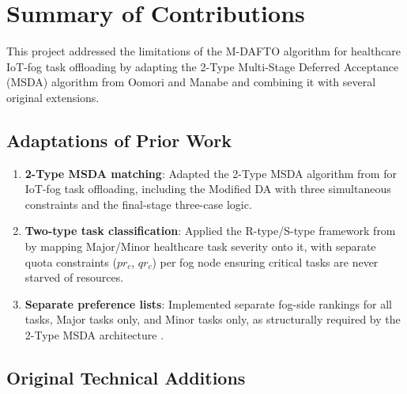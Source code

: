
\section{Summary of Contributions}

This project addressed the limitations of the M-DAFTO algorithm for healthcare IoT-fog task offloading by adapting the 2-Type Multi-Stage Deferred Acceptance (MSDA) algorithm from Oomori and Manabe \cite{oomori2026strategyproof} and combining it with several original extensions.

\subsection*{Adaptations of Prior Work}

\begin{enumerate}
\item \textbf{2-Type MSDA matching}: Adapted the 2-Type MSDA algorithm from \cite{oomori2026strategyproof} for IoT-fog task offloading, including the Modified DA with three simultaneous constraints and the final-stage three-case logic.

\item \textbf{Two-type task classification}: Applied the R-type/S-type framework from \cite{oomori2026strategyproof} by mapping Major/Minor healthcare task severity onto it, with separate quota constraints ($pr_c$, $qr_c$) per fog node ensuring critical tasks are never starved of resources.

\item \textbf{Separate preference lists}: Implemented separate fog-side rankings for all tasks, Major tasks only, and Minor tasks only, as structurally required by the 2-Type MSDA architecture \cite{oomori2026strategyproof}.
\end{enumerate}

\subsection*{Original Technical Additions}

